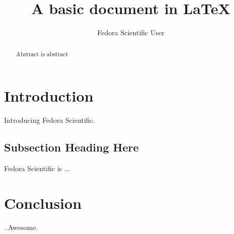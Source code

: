 \documentclass{article}
\begin{document}
\title{A basic document in \LaTeX{}}
\author{Fedora Scientific User}

\maketitle

\begin{abstract}
Abstract is abstract
\end{abstract}

\section{Introduction}
Introducing Fedora Scientific.

\subsection{Subsection Heading Here}
Fedora Scientific is ...



\section{Conclusion}
..Awesome.
\end{document}
